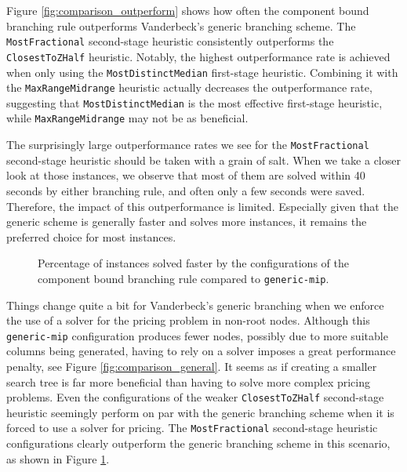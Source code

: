 Figure \ref{fig:comparison_outperform} shows how often the component bound branching rule outperforms Vanderbeck's generic branching scheme. The \texttt{MostFractional} second-stage heuristic consistently outperforms the \texttt{ClosestToZHalf} heuristic. Notably, the highest outperformance rate is achieved when only using the \texttt{MostDistinctMedian} first-stage heuristic. Combining it with the \texttt{MaxRangeMidrange} heuristic actually decreases the outperformance rate, suggesting that \texttt{MostDistinctMedian} is the most effective first-stage heuristic, while \texttt{MaxRangeMidrange} may not be as beneficial.

The surprisingly large outperformance rates we see for the \texttt{MostFractional} second-stage heuristic should be taken with a grain of salt. When we take a closer look at those instances, we observe that most of them are solved within 40 seconds by either branching rule, and often only a few seconds were saved. Therefore, the impact of this outperformance is limited. Especially given that the generic scheme is generally faster and solves more instances, it remains the preferred choice for most instances.

\begin{figure}
	\centering

	\begin{subfigure}{0.495\textwidth}
		\centering
		
	\end{subfigure}
	\hfill
	\begin{subfigure}{0.495\textwidth}
		\centering
		
	\end{subfigure}

	\caption{Percentage of instances solved faster by the configurations of the component bound branching rule compared to \texttt{generic-mip}.}
	\label{fig:comparison_outperform_generic_mip}
\end{figure}

Things change quite a bit for Vanderbeck's generic branching when we enforce the use of a \MIP{} solver for the pricing problem in non-root nodes. Although this \texttt{generic-mip} configuration produces fewer nodes, possibly due to more suitable columns being generated, having to rely on a \MIP{} solver imposes a great performance penalty, see Figure \ref{fig:comparison_general}. It seems as if creating a smaller search tree is far more beneficial than having to solve more complex pricing problems. Even the configurations of the weaker \texttt{ClosestToZHalf} second-stage heuristic seemingly perform on par with the generic branching scheme when it is forced to use a \MIP{} solver for pricing. The \texttt{MostFractional} second-stage heuristic configurations clearly outperform the generic branching scheme in this scenario, as shown in Figure \ref{fig:comparison_outperform_generic_mip}.

